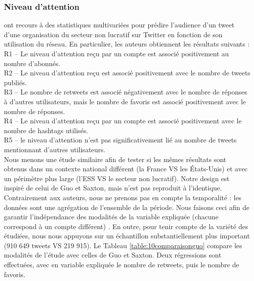     \subsubsection{Niveau d'attention}
        \label{twitter:attention}

        \textcite{guo2017speaking} ont recours à des statistiques multivariées pour prédire l’audience d’un tweet d’une organisation du secteur non lucratif sur Twitter en fonction de son utilisation du réseau. En particulier, les auteurs obtiennent les résultats suivants : \\
        R1 – Le niveau d’attention reçu par un compte est associé positivement au nombre d’abonnés. \\
        R2 – Le niveau d’attention reçu est associé positivement avec le nombre de tweets publiés. \\
        R3 – Le nombre de retweets est associé négativement avec le nombre de réponses à d’autres utilisateurs, mais le nombre de favoris est associé positivement avec le nombre de réponses. \\
        R4 – Le niveau d’attention reçu par un compte est associé positivement avec le nombre de hashtags utilisés.\\
        R5 – le niveau d’attention n’est pas significativement lié au nombre de tweets mentionnant d’autres utilisateurs.\\

        Nous menons une étude similaire afin de tester si les mêmes résultats sont obtenus dans un contexte national différent (la France VS les États-Unis) et avec un périmètre plus large (l’ESS VS le secteur non lucratif). Notre design est inspiré de celui de Guo et Saxton, mais n'est pas reproduit à l'identique. Contrairement aux auteurs, nous ne prenons pas en compte la temporalité : les données sont une agrégation de l’ensemble de la période. Nous faisons ceci afin de garantir l'indépendance des modalités de la variable expliquée (chacune correspond à un compte différent) \parencite{field2009discovering}. En outre, pour tenir compte de la variété des \eess étudiées, nous nous appuyons sur un échantillon substantiellement plus important (910 649 tweets VS 219 915).
        Le Tableau \ref{table:10comparaisonguo} compare les modalités de l’étude avec celles de Guo et Saxton. Deux régressions sont effectuées, avec en variable expliquée le nombre de retweets, puis le nombre de favoris.

